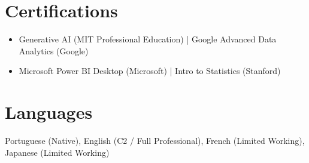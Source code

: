 \documentclass[10pt,a4paper]{article}
\begin{document}
\section*{Certifications}

\begin{itemize}
  \item Generative AI (MIT Professional Education) | Google Advanced Data Analytics (Google)
  \item Microsoft Power BI Desktop (Microsoft) | Intro to Statistics (Stanford)
\end{itemize}

\section*{Languages}

Portuguese (Native), English (C2 / Full Professional), French (Limited Working), Japanese (Limited Working)
\end{document}
